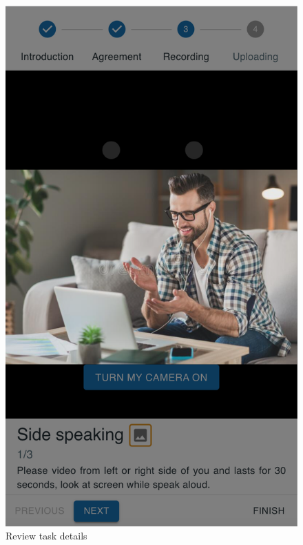 \begin{minipage}{.5\textwidth}
\begin{figure}[H]
    \centering
    \includegraphics[width=\textwidth]{appendix/imgs/web-task-detail.png}
    \caption{Review task details}
    \label{fig:web-task-detail}
\end{figure}
\end{minipage}
